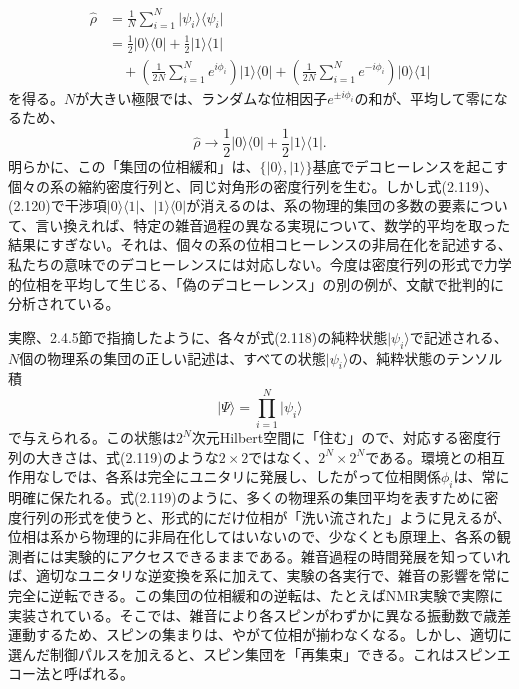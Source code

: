 \hypertarget{srcpage:97}{}\label{srcpage:97}
\begin{equation}\begin{split}\hat\rho&=\frac1N\sum_{i=1}^N\lvert\psi_i\rangle\langle\psi_i\rvert\\&=\frac12\lvert0\rangle\langle0\rvert+\frac12\lvert1\rangle\langle1\rvert\\&\quad+\left(\frac1{2N}\sum_{i=1}^Ne^{i\phi_i}\right)\lvert1\rangle\langle0\rvert+\left(\frac1{2N}\sum_{i=1}^Ne^{-i\phi_i}\right)\lvert0\rangle\langle1\rvert\end{split}\tag{2.119}\end{equation}
を得る。$N$が大きい極限では、ランダムな位相因子$e^{\pm i\phi_i}$の和が、平均して零になるため、
\begin{equation}\hat\rho\longrightarrow\frac12\lvert0\rangle\langle0\rvert+\frac12\lvert1\rangle\langle1\rvert.\tag{2.120}\end{equation}
明らかに、この「集団の位相緩和」は、$\{\lvert0\rangle,\lvert1\rangle\}$基底でデコヒーレンスを起こす個々の系の縮約密度行列と、同じ対角形の密度行列を生む。しかし式(2.119)、(2.120)で干渉項$\lvert0\rangle\langle1\rvert$、$\lvert1\rangle\langle0\rvert$が消えるのは、系の物理的集団の多数の要素について、言い換えれば、特定の雑音過程の異なる実現について、数学的平均を取った結果にすぎない。それは、個々の系の位相コヒーレンスの非局在化を記述する、私たちの意味でのデコヒーレンスには対応しない。今度は密度行列の形式で力学的位相を平均して生じる、「偽のデコヒーレンス」の別の例が、文献\cite{ref122}で批判的に分析されている。

実際、2.4.5節で指摘したように、各々が式(2.118)の純粋状態$\lvert\psi_i\rangle$で記述される、$N$個の物理系の集団の正しい記述は、すべての状態$\lvert\psi_i\rangle$の、純粋状態のテンソル積
\begin{equation}\lvert\Psi\rangle=\prod_{i=1}^N\lvert\psi_i\rangle\tag{2.121}\end{equation}
で与えられる。この状態は$2^N$次元Hilbert空間に「住む」ので、対応する密度行列の大きさは、式(2.119)のような$2\times2$ではなく、$2^N\times2^N$である。環境との相互作用なしでは、各系は完全にユニタリに発展し、したがって位相関係$\phi_i$は、常に明確に保たれる。式(2.119)のように、多くの物理系の集団平均を表すために密度行列の形式を使うと、形式的にだけ位相が「洗い流された」ように見えるが、位相は系から物理的に非局在化してはいないので、少なくとも原理上、各系の観測者には実験的にアクセスできるままである。雑音過程の時間発展を知っていれば、適切なユニタリな逆変換を系に加えて、実験の各実行で、雑音の影響を常に完全に逆転できる。この集団の位相緩和の逆転は、たとえばNMR実験で実際に実装されている。そこでは、雑音により各スピンがわずかに異なる振動数で歳差運動するため、スピンの集まりは、やがて位相が揃わなくなる。しかし、適切に選んだ制御パルスを加えると、スピン集団を「再集束」できる。これはスピンエコー法と呼ばれる。

